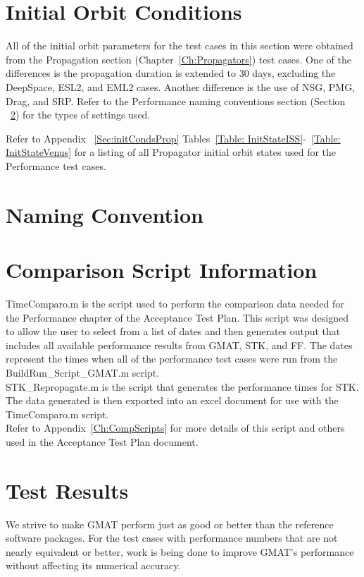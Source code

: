\clearpage
\section{Initial Orbit Conditions}

All of the initial orbit parameters for the test cases in this
section were obtained from the Propagation
section (Chapter~\ref{Ch:Propagators}) test cases. One of the
differences is the propagation duration is extended to 30 days,
excluding the DeepSpace, ESL2, and EML2 cases. Another difference is
the use of NSG, PMG, Drag, and SRP. Refer to the Performance naming
conventions section (Section ~\ref{nameConvPerf}) for the types of
settings used.

Refer to Appendix ~\ref{Sec:initCondsProp} Tables~\ref{Table:
InitStateISS}-~\ref{Table: InitStateVenus} for a listing of all
Propagator initial orbit states used for the Performance test cases.

\clearpage
\section{Naming Convention}
\label{nameConvPerf}


\section{Comparison Script Information}
TimeComparo.m is the script used to perform the comparison data
needed for the Performance chapter of the Acceptance Test Plan. This
script was designed to allow the user to select from a list of dates
and then generates output that includes all available performance
results from GMAT, STK, and FF. The dates represent the times when
all of the performance test cases were run from the
BuildRun\_Script\_GMAT.m script.\\

STK\_Repropagate.m is the script that generates the performance
times for STK. The data generated is then exported into an excel
document for use with the TimeComparo.m script.\\

Refer to Appendix~\ref{Ch:CompScripts} for more details of this
script and others used in the Acceptance Test Plan document.

\section{Test Results}
We strive to make GMAT perform just as good or better than the
reference software packages. For the test cases with performance
numbers that are not nearly equivalent or better, work is being done
to improve GMAT's performance without affecting its numerical
accuracy.

